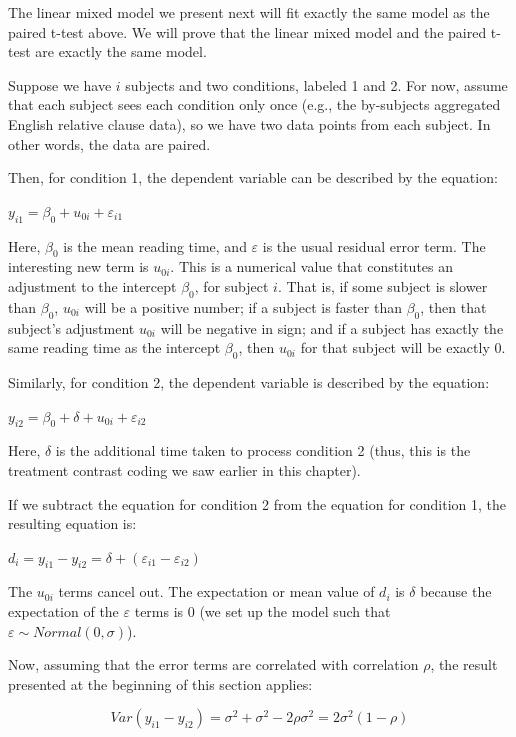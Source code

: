 \documentclass[
  12pt,
]{krantz}
\theoremstyle{definition}
\theoremstyle{definition}
\theoremstyle{definition}
\theoremstyle{definition}
\theoremstyle{remark}
\begin{document}
The linear mixed model we present next will fit exactly the same model as the paired t-test above. We will prove that the linear mixed model and the paired t-test are exactly the same model.

Suppose we have \(i\) subjects and two conditions, labeled 1 and 2. For now, assume that each subject sees each condition only once (e.g., the by-subjects aggregated English relative clause data), so we have two data points from each subject. In other words, the data are paired.

Then, for condition 1, the dependent variable can be described by the equation:

\(y_{i1} = \beta_0 + u_{0i} + \varepsilon_{i1}\)

Here, \(\beta_0\) is the mean reading time, and \(\varepsilon\) is the usual residual error term. The interesting new term is \(u_{0i}\). This is a numerical value that constitutes an adjustment to the intercept \(\beta_0\), for subject \(i\). That is, if some subject is slower than \(\beta_0\), \(u_{0i}\) will be a positive number; if a subject is faster than \(\beta_0\), then that subject's adjustment \(u_{0i}\) will be negative in sign; and if a subject has exactly the same reading time as the intercept \(\beta_0\), then \(u_{0i}\) for that subject will be exactly 0.

Similarly, for condition 2, the dependent variable is described by the equation:

\(y_{i2} = \beta_0 + \delta + u_{0i} + \varepsilon_{i2}\)

Here, \(\delta\) is the additional time taken to process condition 2 (thus, this is the treatment contrast coding we saw earlier in this chapter).

If we subtract the equation for condition 2 from the equation for condition 1, the resulting equation is:

\(d_i=y_{i1} - y_{i2}= \delta + (\varepsilon_{i1}-\varepsilon_{i2})\)

The \(u_{0i}\) terms cancel out.
The expectation or mean value of \(d_i\) is \(\delta\) because the expectation of the \(\varepsilon\) terms is 0 (we set up the model such that \(\varepsilon \sim Normal(0,\sigma)\)).

Now, assuming that the error terms are correlated with correlation \(\rho\), the result presented at the beginning of this section applies:

\begin{equation}
Var(y_{i1}-y_{i2}) = \sigma^2 + \sigma^2-2\rho\sigma^2=2\sigma^2(1-\rho)
\end{equation}
\end{document}
